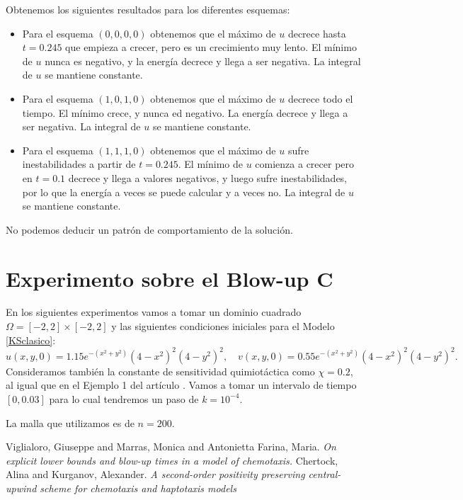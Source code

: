 \documentclass[a4paper,12pt]{article}
\begin{document}
Obtenemos los siguientes resultados para los diferentes esquemas: 
\begin{itemize}
	
	\item Para el esquema $(0,0,0,0)$ obtenemos que el máximo de $u$ decrece hasta $t=0.245$ que empieza a crecer, pero es un crecimiento muy lento. El mínimo de $u$ nunca es negativo, y la energía decrece y llega a ser negativa. La integral de $u$ se mantiene constante. 
	
	\item Para el esquema $(1,0,1,0)$ obtenemos que el máximo de $u$ decrece todo el tiempo. El mínimo crece, y nunca ed negativo. La energía decrece y llega a ser negativa. La integral de $u$ se mantiene constante. 
	
	\item Para el esquema $(1,1,1,0)$ obtenemos que el máximo de $u$ sufre inestabilidades a partir de $t=0.245$. El mínimo de $u$ comienza a crecer pero en $t=0.1$ decrece y llega a valores negativos, y luego sufre inestabilidades, por lo que la energía a veces se puede calcular y a veces no. La integral de $u$ se mantiene constante. 
	
\end{itemize}

	No podemos deducir un patrón de comportamiento de la solución. 

\section{Experimento sobre el Blow-up C}
En los siguientes experimentos vamos a tomar un dominio cuadrado $\Omega=[-2,2]\times[-2,2]$ y las siguientes condiciones iniciales para el Modelo \ref{KSclasico}:
\begin{equation}
u(x,y,0)=1.15e^{-(x^2+y^2)}(4-x^2)^2(4-y^2)^2, \quad v(x,y,0)=0.55e^{-(x^2+y^2)}(4-x^2)^2(4-y^2)^2.
\end{equation}
Consideramos también la constante de sensitividad quimiotáctica como $\chi=0.2$, al igual que en el Ejemplo 1 del artículo \cite{bib:1}. Vamos a tomar un intervalo de tiempo $[0,0.03]$ para lo cual tendremos un paso de $k=10^{-4}$. 

La malla que utilizamos es de $n=200$. 

\begin{thebibliography}{99}
	Viglialoro, Giuseppe and Marras, Monica and Antonietta Farina, Maria. \textit{On explicit lower bounds and blow-up times in a model of chemotaxis.}
	Chertock, Alina and Kurganov, Alexander. \textit{A second-order positivity preserving central-upwind scheme for chemotaxis and haptotaxis models}
\end{thebibliography}
\end{document}
